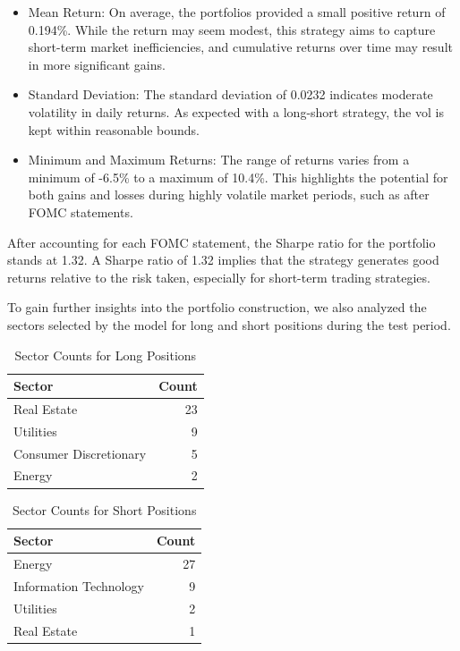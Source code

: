 \documentclass[11pt]{article}
\begin{document}
\begin{itemize}
    \item Mean Return: On average, the portfolios provided a small positive return of 0.194\%. While the return may seem modest, this strategy aims to capture short-term market inefficiencies, and cumulative returns over time may result in more significant gains.
    \item Standard Deviation: The standard deviation of 0.0232 indicates moderate volatility in daily returns. As expected with a long-short strategy, the vol is kept within reasonable bounds.
    \item Minimum and Maximum Returns: The range of returns varies from a minimum of -6.5\% to a maximum of 10.4\%. This highlights the potential for both gains and losses during highly volatile market periods, such as after FOMC statements.
\end{itemize}


After accounting for each FOMC statement, the Sharpe ratio for the portfolio stands at 1.32. A Sharpe ratio of 1.32 implies that the strategy generates good returns relative to the risk taken, especially for short-term trading strategies.

To gain further insights into the portfolio construction, we also analyzed the sectors selected by the model for long and short positions during the test period.

\begin{table}[H]
\centering
\begin{tabular}{lr}
\toprule
\textbf{Sector} & \textbf{Count} \\
\midrule
Real Estate           & 23 \\
Utilities             & 9  \\
Consumer Discretionary & 5  \\
Energy                & 2  \\
\bottomrule
\end{tabular}
\caption{Sector Counts for Long Positions}
\end{table}

\begin{table}[H]
\centering
\begin{tabular}{lr}
\toprule
\textbf{Sector} & \textbf{Count} \\
\midrule
Energy                 & 27 \\
Information Technology & 9  \\
Utilities              & 2  \\
Real Estate            & 1  \\
\bottomrule
\end{tabular}
\caption{Sector Counts for Short Positions}
\end{table}
\end{document}
